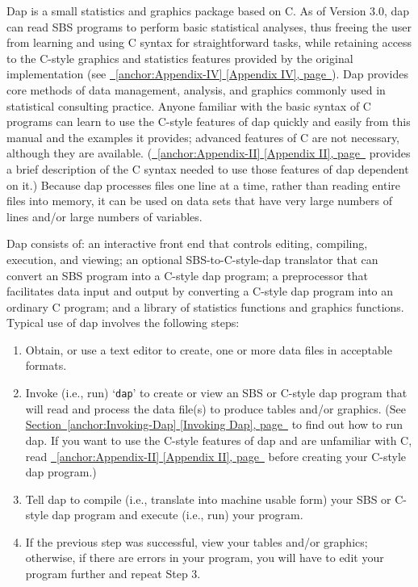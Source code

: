 \documentclass{book}
\renewcommand{\_}{\Texinfounderscore\discretionary{}{}{}}
\begin{document}
Dap is a small statistics and graphics package based on C.
As of Version 3.0, dap can read SBS programs to perform basic statistical
analyses, thus freeing the user from learning and using C syntax
for straightforward tasks,
while retaining access to the C-style graphics and statistics
features provided by the original implementation (see \hyperref[anchor:Appendix-IV]{\chaptername~\ref*{anchor:Appendix-IV} [Appendix IV], page~\pageref*{anchor:Appendix-IV}}).
Dap provides core methods of data management,
analysis, and graphics commonly used in statistical
consulting practice.
Anyone familiar with the basic syntax of C
%
%
programs can learn to use the C-style features of
dap quickly and easily from this manual and the examples it provides;
advanced features of C are not necessary,
although they are available.
(\hyperref[anchor:Appendix-II]{\chaptername~\ref*{anchor:Appendix-II} [Appendix II], page~\pageref*{anchor:Appendix-II}} provides a brief description of the C syntax needed to use
those features of dap dependent on it.)
Because dap processes files one line at a time, rather than reading entire files
into memory, it can be used on data sets that have very large numbers of lines
and/or large numbers of variables.

Dap consists of: an interactive front end that
controls editing, compiling, execution, and viewing;
an optional SBS-to-C-style-dap translator that can convert an SBS program into
a C-style dap program;
a preprocessor that facilitates data input and output by
converting a C-style dap program into an ordinary C program; and a library of
statistics functions and graphics functions.
Typical use of dap involves the following steps:

\begin{enumerate}[start=1]
\item Obtain, or use a text editor to create, one or more data files in acceptable
formats.
\item Invoke (i.e., run) `\texttt{dap}' to create or view an SBS or C-style
dap program that will read and process the data file(s) to
produce tables and/or graphics.
(See \hyperref[anchor:Invoking-Dap]{Section~\ref*{anchor:Invoking-Dap} [Invoking Dap], page~\pageref*{anchor:Invoking-Dap}} to find out how to run dap.
If you want to use the C-style features of dap and
are unfamiliar with C, read \hyperref[anchor:Appendix-II]{\chaptername~\ref*{anchor:Appendix-II} [Appendix II], page~\pageref*{anchor:Appendix-II}} before creating
your C-style dap program.)
\item Tell dap to compile (i.e., translate into machine usable form) your SBS
or C-style dap program and execute (i.e., run) your program.
\item If the previous step was successful, view your tables and/or
graphics; otherwise, if there are errors in your program, you will have to edit your program
further and repeat Step 3.
\end{enumerate}
\end{document}
